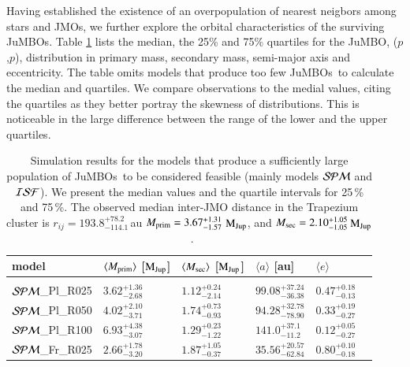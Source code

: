 \documentclass[submission,phys]{lib/SciPost}
\newcommand{\MJup}{\mbox{$\mathrm{{M}}_{\rm Jup}$}}
\newcommand{\jumbos}{\mbox{JuMBOs}}
\begin{document}
Having established the existence of an overpopulation of nearest
neigbors among stars and JMOs, we further explore the orbital
characteristics of the surviving \jumbos.  Table
\ref{Tab:orbital_distributions} lists the median, the 25\% and 75\%
quartiles for the JuMBO, ($p$,$p$), distribution in primary mass,
secondary mass, semi-major axis and eccentricity. The table omits
models that produce too few \jumbos\, to calculate the median and
quartiles. We compare observations to the medial values, citing the
quartiles as they better portray the skewness of distributions.  This
is noticeable in the large difference between the range of the lower
and the upper quartiles.


\begin{table}
  \caption{Simulation results for the models that produce a
    sufficiently large population of \jumbos\, to be considered
    feasible (mainly models ${\cal SPM}$ and ${\cal ISF}$). We present
    the median values and the quartile intervals for 25\,\% and
    75\,\%.  The observed median inter-JMO distance in the Trapezium
    cluster is $r_{ij} = 193.8^{+78.2}_{-114.1}$\,au $M_{\rm prim} =
    3.67^{+1.31}_{-1.57}$\,\MJup, and $M_{\rm sec} =
    2.10^{+1.05}_{-1.05}$\,\MJup\, \cite{2023arXiv231001231P}.  }
\label{Tab:orbital_distributions}
 \centering 
 \begin{tabular}{llllll}
 \hline\hline
model&$\langle M_{\rm prim} \rangle$ [\MJup] & $\langle M_{\rm sec} \rangle$ [\MJup] & $\langle a \rangle$ [au] & $\langle e \rangle$ \\
 \hline \vspace{-0.75em} \\ 
 ${\cal SPM}$\_Pl\_R025 & $3.62^{+1.36}_{-2.68}$ & $1.12^{+0.24}_{-2.14}$ & $99.08^{+37.24}_{-36.38}$ & $0.47^{+0.18}_{-0.13}$ \vspace{0.25em}\\
 ${\cal SPM}$\_Pl\_R050 & $4.02^{+2.10}_{-3.71}$ & $1.74^{+0.73}_{-0.93}$ & $94.28^{+32.78}_{-78.90}$ & $0.33^{+0.19}_{-0.27}$ \vspace{0.25em}\\  
 ${\cal SPM}$\_Pl\_R100 & $6.93^{+4.38}_{-3.07}$ & $1.29^{+0.23}_{-1.22}$ & $141.0^{+37.1}_{-11.2}$ & $0.12^{+0.05}_{-0.27}$ \vspace{0.25em}\\
 ${\cal SPM}$\_Fr\_R025 & $2.66^{+1.78}_{-3.20}$ & $1.87^{+1.05}_{-0.37}$ & $35.56^{+20.57}_{-62.84}$ & $0.80^{+0.10}_{-0.18}$ \vspace{0.25em}\\ 

\end{tabular}
\end{table}
\end{document}
